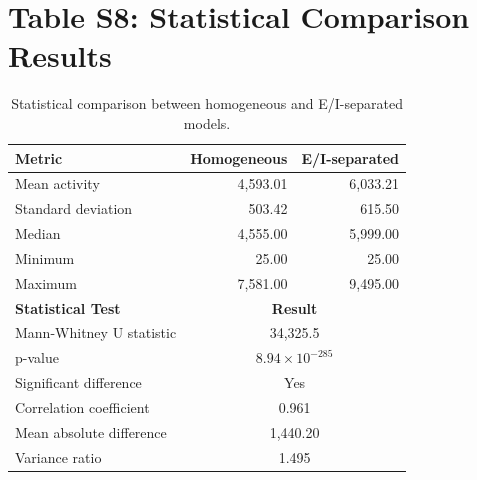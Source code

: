 \documentclass[10pt]{article}
\begin{document}
\section*{Table S8: Statistical Comparison Results}

\begin{table}[h]
\centering
\caption{Statistical comparison between homogeneous and E/I-separated models.}
\begin{tabular}{lrr}
\toprule
\textbf{Metric} & \textbf{Homogeneous} & \textbf{E/I-separated} \\
\midrule
Mean activity & 4,593.01 & 6,033.21 \\
Standard deviation & 503.42 & 615.50 \\
Median & 4,555.00 & 5,999.00 \\
Minimum & 25.00 & 25.00 \\
Maximum & 7,581.00 & 9,495.00 \\
\midrule
\textbf{Statistical Test} & \multicolumn{2}{c}{\textbf{Result}} \\
Mann-Whitney U statistic & \multicolumn{2}{c}{34,325.5} \\
p-value & \multicolumn{2}{c}{$8.94 \times 10^{-285}$} \\
Significant difference & \multicolumn{2}{c}{Yes} \\
Correlation coefficient & \multicolumn{2}{c}{0.961} \\
Mean absolute difference & \multicolumn{2}{c}{1,440.20} \\
Variance ratio & \multicolumn{2}{c}{1.495} \\
\bottomrule
\end{tabular}
\end{table}
\end{document}
